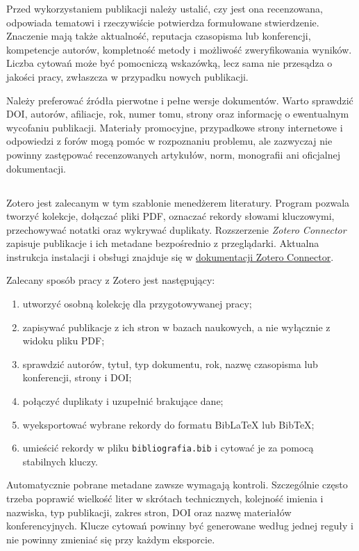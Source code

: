 Przed wykorzystaniem publikacji należy ustalić, czy jest ona recenzowana, odpowiada tematowi i rzeczywiście potwierdza formułowane stwierdzenie. Znaczenie mają także aktualność, reputacja czasopisma lub konferencji, kompetencje autorów, kompletność metody i możliwość zweryfikowania wyników. Liczba cytowań może być pomocniczą wskazówką, lecz sama nie przesądza o jakości pracy, zwłaszcza w przypadku nowych publikacji.

Należy preferować źródła pierwotne i pełne wersje dokumentów. Warto sprawdzić DOI, autorów, afiliacje, rok, numer tomu, strony oraz informację o ewentualnym wycofaniu publikacji. Materiały promocyjne, przypadkowe strony internetowe i odpowiedzi z forów mogą pomóc w rozpoznaniu problemu, ale zazwyczaj nie powinny zastępować recenzowanych artykułów, norm, monografii ani oficjalnej dokumentacji.

\subsection{}

Zotero jest zalecanym w tym szablonie menedżerem literatury. Program pozwala tworzyć kolekcje, dołączać pliki PDF, oznaczać rekordy słowami kluczowymi, przechowywać notatki oraz wykrywać duplikaty. Rozszerzenie \emph{Zotero Connector} zapisuje publikacje i ich metadane bezpośrednio z przeglądarki. Aktualna instrukcja instalacji i obsługi znajduje się w \href{https://www.zotero.org/support/connector}{dokumentacji Zotero Connector}.

Zalecany sposób pracy z Zotero jest następujący:
\begin{enumerate}
  \item utworzyć osobną kolekcję dla przygotowywanej pracy;
  \item zapisywać publikacje z ich stron w bazach naukowych, a nie wyłącznie z widoku pliku PDF;
  \item sprawdzić autorów, tytuł, typ dokumentu, rok, nazwę czasopisma lub konferencji, strony i DOI;
  \item połączyć duplikaty i uzupełnić brakujące dane;
  \item wyeksportować wybrane rekordy do formatu BibLaTeX lub BibTeX;
  \item umieścić rekordy w pliku \texttt{bibliografia.bib} i cytować je za pomocą stabilnych kluczy.
\end{enumerate}

Automatycznie pobrane metadane zawsze wymagają kontroli. Szczególnie często trzeba poprawić wielkość liter w skrótach technicznych, kolejność imienia i nazwiska, typ publikacji, zakres stron, DOI oraz nazwę materiałów konferencyjnych. Klucze cytowań powinny być generowane według jednej reguły i nie powinny zmieniać się przy każdym eksporcie.

